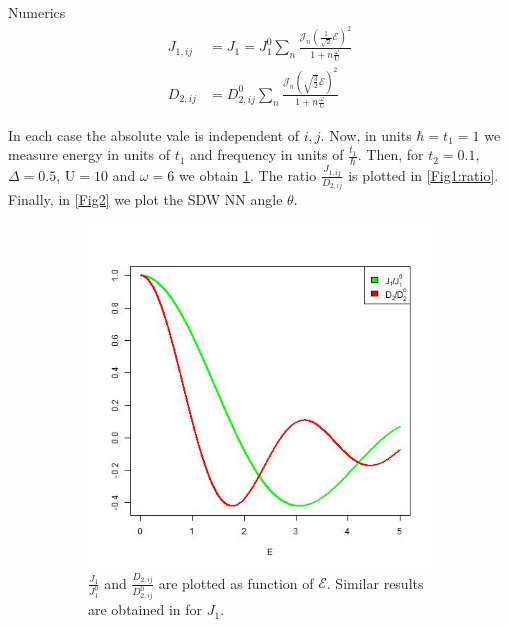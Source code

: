 \begin{section}{Numerics}
\begin{align}
J_{1,ij} &= J_{1} = J_{1}^0  \sum_{n} \frac{\mathcal{J}_n(\frac{1}{\sqrt{2}}\mathcal{E})^2}{1+n\frac{\omega}{\text{U}}} \\
D_{2,ij} &= D_{2,ij}^0  \sum_{n} \frac{\mathcal{J}_n(\sqrt{\frac{3}{2}}\mathcal{E})^2}{1+n\frac{\omega}{\text{U}}}
\end{align}

In each case the absolute vale is independent of $i,j$.  Now, in units $\hbar=t_1=1$ we measure energy in units of $t_1$ and frequency in units of $\frac{t_1}{\hbar}$. Then, for $t_2 = 0.1$, $\Delta = 0.5$, $\text{U} = 10$ and $\omega = 6$ we obtain \ref{Fig1:NNvsNNN}. The ratio $\frac{J_{1,ij}}{D_{2,ij}}$ is plotted in \ref{Fig1:ratio}. Finally, in \ref{Fig2} we plot the SDW NN angle $\theta$.

\begin{figure}
\centering
\begin{subfigure}{.5\textwidth}
  \centering
  \includegraphics[width=1\linewidth]{Chapters/NNvsNNN.jpg}
  \caption{$\frac{J_{1}}{J_{1}^0}$ and $\frac{D_{2,ij}}{D_{2,ij}^0}$ are plotted as function of $\mathcal{E}$. Similar results are obtained in \cite{Mentink2015} for $J_{1}$.}
  \label{Fig1:NNvsNNN}
\end{subfigure}%
\begin{subfigure}{.5\textwidth}

\end{subfigure}
\end{figure}
\end{section}
